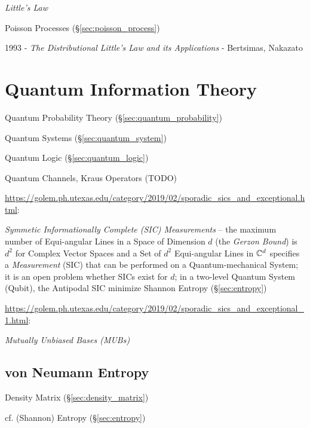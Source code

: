 \emph{Little's Law}

Poisson Processes (\S\ref{sec:poisson_process})

1993 - \emph{The Distributional Little's Law and its Applications} - Bertsimas,
Nakazato



\section{Quantum Information Theory}\label{sec:quantum_information_theory}

Quantum Probability Theory (\S\ref{sec:quantum_probability})

Quantum Systems (\S\ref{sec:quantum_system})

Quantum Logic (\S\ref{sec:quantum_logic})

Quantum Channels, Kraus Operators (TODO)

\url{https://golem.ph.utexas.edu/category/2019/02/sporadic_sics_and_exceptional.html}:

\emph{Symmetic Informationally Complete (SIC) Measurements} -- the maximum
number of Equi-angular Lines in a Space of Dimension $d$ (the \emph{Gerzon
  Bound}) is $d^2$ for Complex Vector Spaces and a Set of $d^2$ Equi-angular
Lines in $\mathbb{C}^d$ specifies a \emph{Measurement} (SIC) that can be performed
on a Quantum-mechanical System;
it is an open problem whether SICs exist for $d$; in a two-level Quantum System
(Qubit), the Antipodal SIC minimize Shannon Entropy (\S\ref{sec:entropy})

\url{https://golem.ph.utexas.edu/category/2019/02/sporadic_sics_and_exceptional_1.html}:

\emph{Mutually Unbiased Bases (MUBs)}



\subsection{von Neumann Entropy}\label{sec:vonneumann_entropy}

Density Matrix (\S\ref{sec:density_matrix})

cf. (Shannon) Entropy (\S\ref{sec:entropy})

